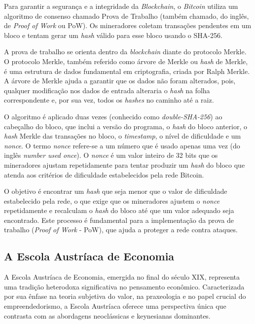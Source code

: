 \documentclass[article,12pt,oneside,a4paper,english,brazil]{unifil}
\begin{document}
\begin{Spacing}{1.5}
Para garantir a segurança e a integridade da \textit{Blockchain}, o \textit{Bitcoin} utiliza um algoritmo de consenso chamado Prova de Trabalho (também chamado, do inglês, de \textit{Proof of Work} ou PoW). Os mineradores coletam transações pendentes em um bloco e tentam gerar um \textit{hash} válido para esse bloco usando o SHA-256.

A prova de trabalho se orienta dentro da \textit{blockchain} diante do protocolo Merkle. O protocolo Merkle, também referido como árvore de Merkle ou \textit{hash} de Merkle, é uma estrutura de dados fundamental em criptografia, criada por Ralph Merkle. A árvore de Merkle ajuda a garantir que os dados não foram alterados, pois, qualquer modificação nos dados de entrada alteraria o \textit{hash} na folha correspondente e, por sua vez, todos os \textit{hashes} no caminho até a raiz.

O algoritmo é aplicado duas vezes (conhecido como \textit{double-SHA-256}) ao cabeçalho do bloco, que inclui a versão do programa, o \textit{hash} do bloco anterior, o \textit{hash} Merkle das transações no bloco, o \textit{timestamp}, o nível de dificuldade e um \textit{nonce}. O termo \textit{nonce} refere-se a um número que é usado apenas uma vez (do inglês \textit{number used once}). O \textit{nonce} é um valor inteiro de 32 bits que os mineradores ajustam repetidamente para tentar produzir um \textit{hash} do bloco que atenda aos critérios de dificuldade estabelecidos pela rede Bitcoin.

O objetivo é encontrar um \textit{hash} que seja menor que o valor de dificuldade estabelecido pela rede, o que exige que os mineradores ajustem o \textit{nonce} repetidamente e recalculam o \textit{hash} do bloco até que um valor adequado seja encontrado. Este processo é fundamental para a implementação da prova de trabalho (\textit{Proof of Work} - PoW), que ajuda a proteger a rede contra ataques.

\subsection*{A Escola Austríaca de Economia} \label{sec:austriaca}

A Escola Austríaca de Economia, emergida no final do século XIX, representa uma tradição heterodoxa significativa no pensamento econômico. Caracterizada por sua ênfase na teoria subjetiva do valor, na praxeologia e no papel crucial do empreendedorismo, a Escola Austríaca oferece uma perspectiva única que contrasta com as abordagens neoclássicas e keynesianas dominantes.


\end{Spacing}
\end{document}
